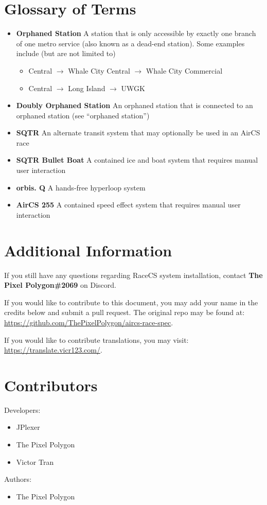 \documentclass{article}
\newcommand{\defterm}[2]{\textbf{#1} #2}
\begin{document}
\section{Glossary of Terms}
\begin{itemize}
    \item \defterm{Orphaned Station}{A station that is only accessible by exactly one branch of one metro service (also known as a dead-end station). Some examples include (but are not limited to)}
    \begin{itemize}
        \item Central $\rightarrow$ Whale City Central $\rightarrow$ Whale City Commercial
        \item Central $\rightarrow$ Long Island $\rightarrow$ UWGK
    \end{itemize}
    \item \defterm{Doubly Orphaned Station}{An orphaned station that is connected to an orphaned station (see ``orphaned station'')}
    \item \defterm{SQTR}{An alternate transit system that may optionally be used in an AirCS race}
    \item \defterm{SQTR Bullet Boat}{A contained ice and boat system that requires manual user interaction}
    \item \defterm{orbis. Q}{A hands-free hyperloop system}
    \item \defterm{AirCS 255}{A contained speed effect system that requires manual user interaction}
\end{itemize}

\pagebreak

\section{Additional Information}
If you still have any questions regarding RaceCS system installation, contact \textbf{The Pixel Polygon\#2069} on Discord.

\medskip

If you would like to contribute to this document, you may add your name in the credits below and submit a pull request. The original repo may be found at: \url{https://github.com/ThePixelPolygon/aircs-race-spec}.

\medskip

If you would like to contribute translations, you may visit: \url{https://translate.vicr123.com/}.

\pagebreak

\section{Contributors}
Developers:
\begin{itemize}
    \item JPlexer
    \item The Pixel Polygon
    \item Victor Tran
\end{itemize}
Authors:
\begin{itemize}
    \item The Pixel Polygon
\end{itemize}
\end{document}
